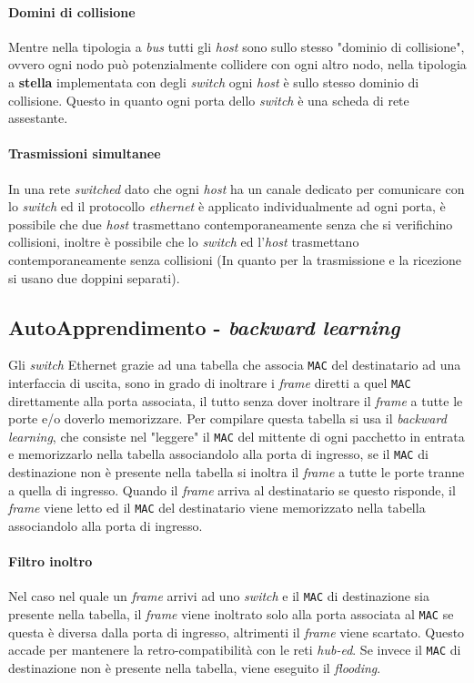     \paragraph{Domini di collisione} Mentre nella tipologia a \textit{bus} tutti gli \textit{host} sono sullo stesso "dominio di collisione", ovvero ogni nodo può potenzialmente collidere con ogni altro nodo, nella tipologia a \textbf{stella} implementata con degli \textit{switch} ogni \textit{host} è sullo stesso dominio di collisione. Questo in quanto ogni porta dello \textit{switch} è una scheda di rete assestante.
    \paragraph{Trasmissioni simultanee} In una rete \textit{switched} dato che ogni \textit{host} ha un canale dedicato per comunicare con lo \textit{switch} ed il protocollo \textit{ethernet} è applicato individualmente ad ogni porta, è possibile che due \textit{host} trasmettano contemporaneamente senza che si verifichino collisioni, inoltre è possibile che lo \textit{switch} ed l'\textit{host} trasmettano contemporaneamente senza collisioni (In quanto per la trasmissione e la ricezione si usano due doppini separati).
    \subsection{AutoApprendimento - \textit{backward learning}}
        Gli \textit{switch} Ethernet grazie ad una tabella che associa \texttt{MAC} del destinatario ad una interfaccia di uscita, sono in grado di inoltrare i \textit{frame} diretti a quel \texttt{MAC} direttamente alla porta associata, il tutto senza dover inoltrare il \textit{frame} a tutte le porte e/o doverlo memorizzare. Per compilare questa tabella si usa il \textit{backward learning}, che consiste nel "leggere" il \texttt{MAC} del mittente di ogni pacchetto in entrata e memorizzarlo nella tabella associandolo alla porta di ingresso, se il \texttt{MAC} di destinazione non è presente nella tabella si inoltra il \textit{frame} a tutte le porte tranne a quella di ingresso. Quando il \textit{frame} arriva al destinatario se questo risponde, il \textit{frame} viene letto ed il \texttt{MAC} del destinatario viene memorizzato nella tabella associandolo alla porta di ingresso.
        \paragraph{Filtro inoltro} Nel caso nel quale un \textit{frame} arrivi ad uno \textit{switch} e il \texttt{MAC} di destinazione sia presente nella tabella, il \textit{frame} viene inoltrato solo alla porta associata al \texttt{MAC} se questa è diversa dalla porta di ingresso, altrimenti il \textit{frame} viene scartato. Questo accade per mantenere la retro-compatibilità con le reti \textit{hub-ed}. Se invece il \texttt{MAC} di destinazione non è presente nella tabella, viene eseguito il \textit{flooding}.
